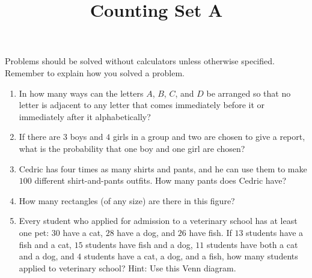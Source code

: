 \documentclass{article}
\title{Counting Set A}
\date{}
\author{}
\begin{document}
\maketitle
\noindent Problems should be solved without calculators unless otherwise 
specified. Remember to explain how you solved a problem.
\begin{enumerate}
    \item In how many ways can the letters $A$, $B$, $C$, and $D$ be 
        arranged so that no letter is adjacent to any letter that comes 
        immediately before it or immediately after it alphabetically?
        \vspace{3cm}
    \item If there are $3$ boys and $4$ girls in a group and two are chosen 
        to give a report, what is the probability that one boy and one girl 
        are chosen?
        \vspace{3cm}
    \item Cedric has four times as many shirts and pants, and he can use 
        them to make $100$ different shirt-and-pants outfits. How many pants 
        does Cedric have?
        \vspace{3cm}
    \item How many rectangles (of any size) are there in this figure?
        \begin{center}
        \end{center}
        \vspace{3cm}
    \item Every student who applied for admission to a veterinary school has 
        at least one pet: $30$ have a cat, $28$ have a dog, and $26$ have 
        fish. If $13$ students have a fish and a cat, $15$ students have 
        fish and a dog, $11$ students have both a cat and a dog, and $4$ 
        students have a cat, a dog, and a fish, how many students applied to 
        veterinary school? Hint: Use this Venn diagram.
        \begin{center}
        \end{center}
        \vspace{3cm}
\end{enumerate}
\end{document}
